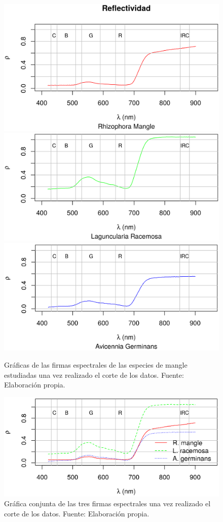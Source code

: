 \begin{figure}
	\centering
	\includegraphics[width=0.8\linewidth]{./Imagenes/RMcorte.eps}
	\includegraphics[width=0.8\linewidth]{./Imagenes/LRcorte.eps}
	\includegraphics[width=0.8\linewidth]{./Imagenes/AGcorte.eps}
	\caption[Firmas espectrales cortadas]{Gráficas de las firmas espectrales de las especies de mangle estudiadas una vez realizado el corte de los datos. Fuente: Elaboración propia.}
	\label{fig:firmas_espectrales_corte}
\end{figure}

\begin{figure}
	\centering
	\includegraphics[width=0.8\linewidth]{./Imagenes/ralcorte.eps}
	\caption[Firmas espectrales cortadas de las tres especies]{Gráfica conjunta de las tres firmas espectrales una vez realizado el corte de los datos. Fuente: Elaboración propia.}
	\label{fig:ral_corte}
\end{figure}

